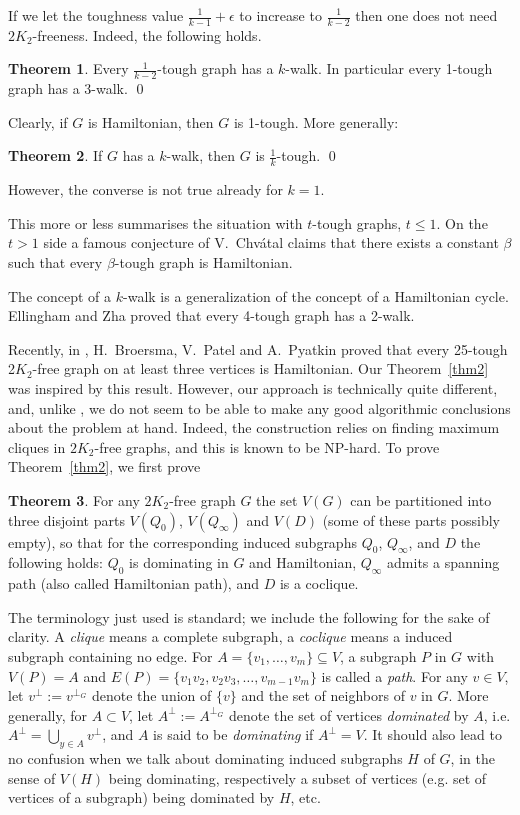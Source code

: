 \documentclass{amsart}
\theoremstyle{definition}
\newtheorem{theorem}{Theorem}
\begin{document}
If we let the toughness value $\frac{1}{k-1}+\epsilon$ to increase to 
$\frac{1}{k-2}$ then
one does not need $2K_2$-freeness. Indeed, the following holds.
\begin{theorem}\cite{jackson1990k}\label{cthm1}
Every $\frac{1}{k-2}$-tough graph has a $k$-walk. 
In particular every 1-tough graph has a 3-walk. \qed
\end{theorem}
Clearly, if $G$ is
Hamiltonian, then $G$ is 1-tough.  More generally:
\begin{theorem}\cite{jackson1990k}\label{add}
If $G$ has a $k$-walk, then $G$ is $\frac{1}{k}$-tough. \qed
\end{theorem} 
However, the converse is not true already for $k=1$.  

This more or less summarises the situation with $t$-tough graphs, $t\leq 1$.
On the $t>1$ side 
a famous conjecture of V.~Chv\'{a}tal \cite{chvatal1973tough} claims
that there exists a constant $\beta$ such that every
$\beta$-tough graph is Hamiltonian.  

The concept of a $k$-walk is a generalization of the concept of a Hamiltonian cycle.
Ellingham and Zha \cite{ellingham2000toughness} proved that
every 4-tough graph has a 2-walk.

Recently, in \cite{broersma2014toughness}, H.~Broersma, V.~Patel and A.~Pyatkin proved that 
every 25-tough 2$K_2$-free graph on at least three vertices is Hamiltonian.
Our Theorem~\ref{thm2} was inspired by this result.  
However, our
approach is technically quite different, and, unlike \cite{broersma2014toughness}, we do not seem to be
able to make any good algorithmic conclusions about the problem at hand.
Indeed, the construction relies on finding maximum cliques in
$2K_2$-free graphs, and this is known to be NP-hard. 
To prove Theorem~\ref{thm2}, we first prove
\begin{theorem}\label{thm1}
For any $2K_2$-free graph $G$ the set $V(G)$ 
can be partitioned into three disjoint parts $V(Q_0)$, $V(Q_{\infty})$ and $V(D)$ (some of these parts possibly empty), so that for the corresponding induced subgraphs
$Q_0$, $Q_\infty$, and $D$ the following holds: $Q_0$ is dominating in $G$ and Hamiltonian, 
$Q_{\infty}$ admits a spanning path (also called Hamiltonian path), 
and $D$ is a coclique.
\end{theorem}

The terminology just used is standard; we include the following for the sake of
clarity.  A {\em clique} means a complete subgraph, a {\em coclique} means a
induced subgraph containing no edge. For $A=\{v_1,\ldots,v_m\}\subseteq V$, a
subgraph $P$ in $G$ with $V(P)=A$ and
$E(P)=\{v_1v_2,v_2v_3,\ldots,v_{m-1}v_m\}$ is called a {\em path}.  For any
$v\in V$, let $v^\perp:=v^{\perp_G}$ denote the union of $\{v\}$ and the set of
neighbors of $v$ in $G$.  More generally, for $A\subset V$, let
$A^\perp:=A^{\perp_G}$ denote the set of vertices {\em dominated} by $A$, i.e.
$A^\perp=\bigcup\limits_{y\in A}v^\perp$, and $A$ is said to be {\em
dominating} if $A^\perp=V$.  It should also lead to no confusion when we talk
about  dominating induced subgraphs $H$ of $G$, in the sense of $V(H)$ being
dominating, respectively a subset of vertices (e.g. set of vertices of a
subgraph) being dominated by $H$, etc.
\end{document}
